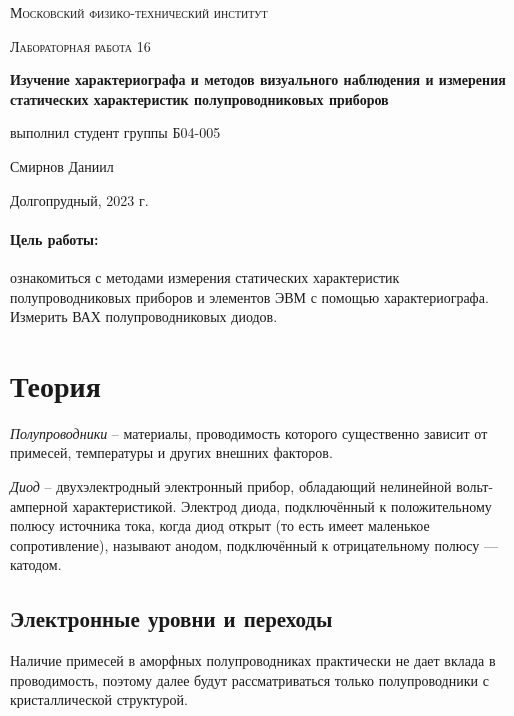 \documentclass[a4paper, 12pt]{article}
\begin{document}
\begin{titlepage}
	\centering
	\vspace{5cm}
	{\scshape\LARGE Московский физико-технический институт \par}
	\vspace{4cm}
	{\scshape\Large Лабораторная работа 16 \par}
	\vspace{1cm}
	{\huge\bfseries Изучение характериографа и методов визуального наблюдения и измерения статических характеристик полупроводниковых приборов \par}
	\vspace{1cm}
	\vfill
\begin{flushright}
	{\large выполнил студент группы Б04-005}\par
	\vspace{0.3cm}
	Смирнов Даниил
\end{flushright}

	\vfill
	
	Долгопрудный, 2023 г.
\end{titlepage}
	
 \paragraph*{Цель работы:} ознакомиться с методами измерения статических характеристик полупроводниковых приборов и элементов ЭВМ с помощью характериографа. Измерить ВАХ полупроводниковых диодов.
	
\section*{Теория}

\textit{Полупроводники} – материалы, проводимость которого существенно зависит от примесей, температуры и других внешних факторов.

\textit{Диод} – двухэлектродный электронный прибор, обладающий нелинейной вольт-амперной характеристикой. Электрод диода, подключённый к положительному полюсу источника тока,
когда диод открыт (то есть имеет маленькое сопротивление), называют
анодом, подключённый к отрицательному полюсу — катодом.

\subsection*{Электронные уровни и переходы}

Наличие примесей в аморфных полупроводниках практически не дает вклада в проводимость, поэтому далее будут рассматриваться только полупроводники с кристаллической структурой.
\end{document}
